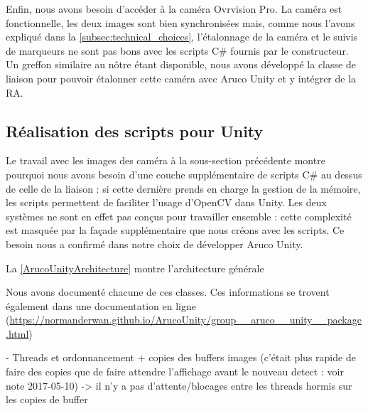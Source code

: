 Enfin, nous avons besoin d'accéder à la caméra Ovrvision Pro. La caméra est fonctionnelle, les deux images sont bien synchronisées mais, comme nous l'avons expliqué dans la \autoref{subsec:technical_choices}, l'étalonnage de la caméra et le suivis de marqueurs ne sont pas bons avec les scripts C\# fournis par le constructeur. Un greffon similaire au nôtre étant disponible, nous avons développé la classe  de liaison  pour pouvoir étalonner cette caméra avec Aruco Unity et y intégrer de la RA.


\subsection{Réalisation des scripts pour Unity}
\label{subsec:aruco_unity_scripts}
Le travail avec les images des caméra à la sous-section précédente montre pourquoi nous avons besoin d'une couche supplémentaire de scripts C\# au dessus de celle de la liaison : si cette dernière prends en charge la gestion de la mémoire, les scripts permettent de faciliter l'usage d'OpenCV dans Unity. Les deux systèmes ne sont en effet pas conçus pour travailler ensemble : cette complexité est masquée par la façade supplémentaire que nous créons avec les scripts. Ce besoin nous a confirmé dans notre choix de développer Aruco Unity.

La \autoref{ArucoUnityArchitecture} montre l'architecture générale 

Nous avons documenté chacune de ces classes. Ces informations se trovent également dans une documentation en ligne (\url{https://normanderwan.github.io/ArucoUnity/group__aruco__unity__package.html}) %


- Threads et ordonnancement + copies des buffers images (c'était plus rapide de faire des copies que de faire attendre l'affichage avant le nouveau detect : voir note 2017-05-10) -> il n'y a pas d'attente/blocages entre les threads hormis sur les copies de buffer

